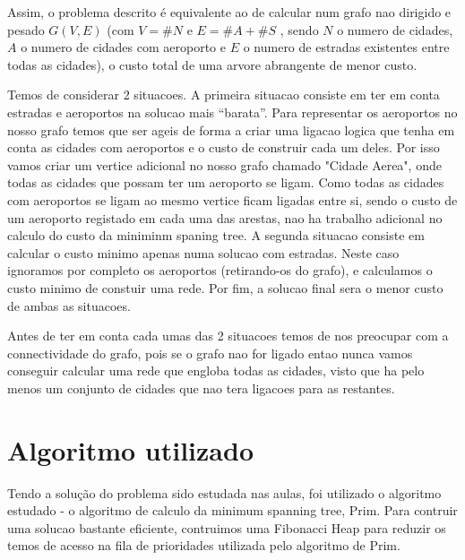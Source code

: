 \documentclass{scrartcl}
\begin{document}
Assim, o problema descrito é equivalente ao de calcular num grafo nao dirigido e pesado $G(V,E)$ (com $V = \#N$ e $E = \#A+\#S  $ , sendo $N$ o numero de cidades, $A$ o numero de cidades com aeroporto e $E$ o numero de estradas existentes entre todas as cidades), o custo total de uma arvore abrangente de menor custo.

Temos de considerar 2 situacoes. A primeira situacao consiste em ter em conta estradas e aeroportos na solucao mais ``barata''. Para representar os aeroportos no nosso grafo temos que ser ageis de forma a criar uma ligacao logica que tenha em conta as cidades com aeroportos e o custo de construir cada um deles. Por isso vamos criar um vertice adicional no nosso grafo chamado "Cidade Aerea", onde todas as cidades que possam ter um aeroporto se ligam. Como todas as cidades com aeroportos se ligam ao mesmo vertice ficam ligadas entre si, sendo o custo de um aeroporto registado em cada uma das arestas, nao ha trabalho adicional no calculo do custo da miniminm spaning tree. A segunda situacao consiste em calcular o custo minimo apenas numa solucao com estradas. Neste caso ignoramos por completo os aeroportos (retirando-os do grafo), e calculamos o custo minimo de constuir uma rede. Por fim, a solucao final sera o menor custo de ambas as situacoes.

Antes de ter em conta cada umas das 2 situacoes temos de nos preocupar com a connectividade do grafo, pois se o grafo nao for ligado entao nunca vamos conseguir calcular uma rede que engloba todas as cidades, visto que ha pelo menos um conjunto de cidades que nao tera ligacoes para as restantes.

\section*{Algoritmo utilizado}
Tendo a solução do problema sido estudada nas aulas, foi utilizado o algoritmo estudado - o algoritmo de calculo da minimum spanning tree, Prim. Para contruir uma solucao bastante eficiente, contruimos uma Fibonacci Heap para reduzir os temos de acesso na fila de prioridades utilizada pelo algoritmo de Prim.
\end{document}
